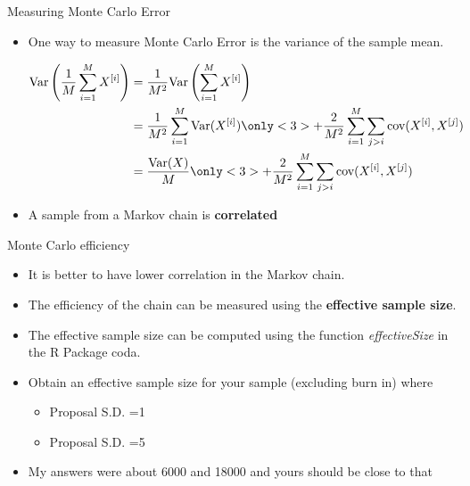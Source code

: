 \documentclass[10pt]{beamer}
\begin{document}
\begin{frame}{Measuring Monte Carlo Error}
\begin{itemize}
\item One way to measure Monte Carlo Error is the variance of the sample mean.

\begin{align*}
\mbox{Var}\left(\frac{1}{M}\sum_{i=1}^M X^{[i]}\right)&=\frac{1}{M^2} \mbox{Var}\left(\sum_{i=1}^M X^{[i]}\right)\\
&=\frac{1}{M^2} \sum_{i=1}^M\mbox{Var}(X^{[i]})
\only<3>{+\frac{2}{M^2}\sum_{i=1}^M\sum_{j>i}\mbox{cov}(X^{[i]},X^{[j]})}\\
&=\frac{\mbox{Var}(X)}{M}
\only<3>{+\frac{2}{M^2}\sum_{i=1}^M\sum_{j>i}\mbox{cov}(X^{[i]},X^{[j]})}\\
\end{align*}

\item A sample from a Markov chain is {\bf correlated}
\end{itemize}
\end{frame}
\begin{frame}{Monte Carlo efficiency}
\begin{itemize}
\item It is better to have lower correlation in the Markov chain.

\item The efficiency of the chain can be measured using the {\bf effective sample size}.

\item The effective sample size can be computed using the function {\em effectiveSize} in the R Package coda.

\item Obtain an effective sample size for your sample (excluding burn in) where

\begin{itemize}
\item Proposal S.D. =1
\item Proposal S.D. =5
\end{itemize}

\item My answers were about 6000 and 18000 and yours should be close to that
\end{itemize}
\end{frame}
\end{document}

